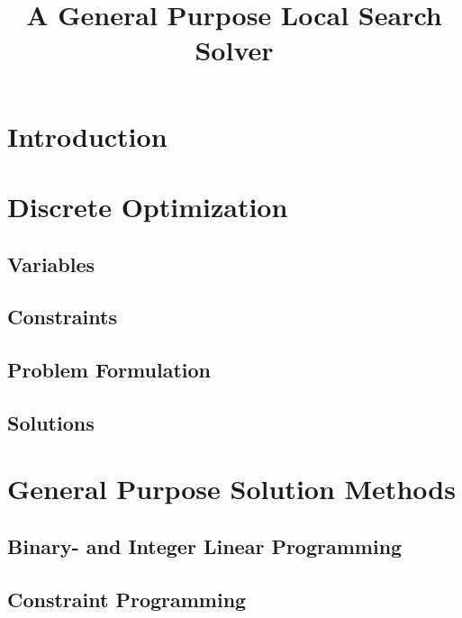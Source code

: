 \documentclass[a4paper,11pt]{article}
\title{A General Purpose Local Search Solver}
\begin{document}
\maketitle

\thispagestyle{empty}
\tableofcontents
\thispagestyle{empty}
\newpage
\setcounter{page}{1}
\section{Introduction}
 
 \newpage
 
\section{Discrete Optimization}

  \subsection{Variables} 
  \subsection{Constraints}
  \subsection{Problem Formulation} %
  
  \subsection{Solutions}
  
  
\newpage  
\section{General Purpose Solution Methods}  
  
  \subsection{Binary- and Integer Linear Programming} %
  
  
  \subsection{Constraint Programming}
  
\end{document}
